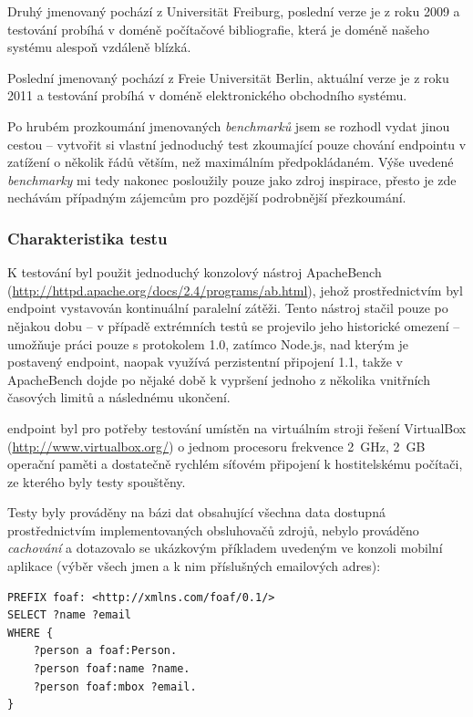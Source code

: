 Druhý jmenovaný pochází z Universität Freiburg, poslední verze je z roku 2009 a testování probíhá v doméně počítačové bibliografie, která je doméně našeho systému alespoň vzdáleně blízká.

Poslední jmenovaný pochází z Freie Universität Berlin, aktuální verze je z roku 2011 a testování probíhá v doméně elektronického obchodního systému.

Po hrubém prozkoumání jmenovaných \textit{benchmarků} jsem se rozhodl vydat jinou cestou -- vytvořit si vlastní jednoduchý test zkoumající pouze chování  endpointu v zatížení o několik řádů větším, než maximálním předpokládaném. Výše uvedené \textit{benchmarky} mi tedy nakonec posloužily pouze jako zdroj inspirace, přesto je zde nechávám případným zájemcům pro pozdější podrobnější přezkoumání.

\subsubsection{Charakteristika testu}
K testování byl použit jednoduchý konzolový nástroj ApacheBench (\url{http://httpd.apache.org/docs/2.4/programs/ab.html}), jehož prostřednictvím byl  endpoint vystavován kontinuální paralelní zátěži. Tento nástroj stačil pouze po nějakou dobu -- v případě extrémních testů se projevilo jeho historické omezení -- umožňuje práci pouze s protokolem  1.0, zatímco Node.js, nad kterým je postavený  endpoint, naopak využívá perzistentní připojení  1.1, takže v ApacheBench dojde po nějaké době k vypršení jednoho z několika vnitřních časových limitů a následnému ukončení.

 endpoint byl pro potřeby testování umístěn na virtuálním stroji řešení VirtualBox (\url{http://www.virtualbox.org/}) o jednom procesoru frekvence 2~GHz, 2~GB operační paměti a dostatečně rychlém síťovém připojení k hostitelskému počítači, ze kterého byly testy spouštěny.

Testy byly prováděny na bázi dat obsahující všechna data dostupná prostřednictvím implementovaných obsluhovačů zdrojů, nebylo prováděno \textit{cachování} a dotazovalo se ukázkovým příkladem uvedeným ve  konzoli mobilní aplikace (výběr všech jmen a k nim příslušných emailových adres):
\begin{verbatim}
PREFIX foaf: <http://xmlns.com/foaf/0.1/>
SELECT ?name ?email
WHERE {
    ?person a foaf:Person.
    ?person foaf:name ?name.
    ?person foaf:mbox ?email.
}
\end{verbatim}

